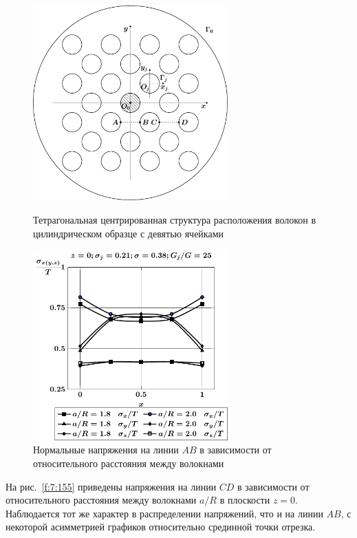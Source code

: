 \begin{figure}[h!]
\centering\footnotesize
\parbox[b]{7.5cm}{\centering\includegraphics[width=7.5cm]{inc-25.pdf}
\caption{Тетрагональная центрированная структура расположения волокон в цилиндрическом образце с девятью ячейками
\label{f:7:153}}}\hfil\hfil
\parbox[b]{7.5cm}{\centering\includegraphics[width=7.5cm]{inc25-a-h10-r10-g25-z0-ab.pdf}
\caption{Нормальные напряжения на линии $AB$ в зависимости от относительного расстояния между волокнами 
\label{f:7:154}}}
\end{figure}

На рис.~\ref{f:7:155} приведены напряжения на линии $CD$ в зависимости от относительного расстояния между волокнами $a/R$ в плоскости $z=0$. Наблюдается тот же характер в распределении напряжений, что и на линии $AB$, с некоторой асимметрией графиков относительно срединной точки отрезка.

